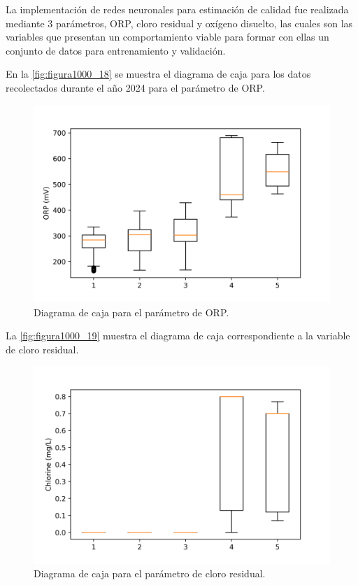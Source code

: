 La implementación de redes neuronales para estimación de calidad fue realizada mediante 3 parámetros, ORP, cloro residual y oxígeno disuelto, las cuales son las variables que presentan un comportamiento viable para formar 
con ellas un conjunto de datos para entrenamiento y validación.

En la \autoref{fig:figura1000_18} se muestra el diagrama de caja para los datos recolectados durante el año 2024 para el parámetro de ORP.

\begin{figure}[h]
	\centering
	\includegraphics[scale=1.0]{imgss168.png}
	\caption{Diagrama de caja para el parámetro de ORP.}
	\label{fig:figura1000_18}
\end{figure}

\clearpage

La \autoref{fig:figura1000_19} muestra el diagrama de caja correspondiente a la variable de cloro residual.

\begin{figure}[h]
	\centering
	\includegraphics[scale=1.0]{imgss169.png}
	\caption{Diagrama de caja para el parámetro de cloro residual.}
	\label{fig:figura1000_19}
\end{figure}

